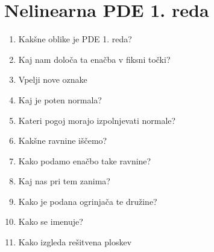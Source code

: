 \documentclass{article}
\begin{document}
    \section{Nelinearna PDE 1. reda}
    \begin{enumerate}
        \item Kakšne oblike je PDE 1. reda?
        \item Kaj nam določa ta enačba v fiksni točki?
        \item Vpelji nove oznake
        \item Kaj je poten normala?
        \item Kateri pogoj morajo izpolnjevati normale?
        \item Kakšne ravnine iščemo?
        \item Kako podamo enačbo take ravnine?
        \item Kaj nas pri tem zanima?
        \item Kako je podana ogrinjača te družine?
        \item Kako se imenuje?
        \item Kako izgleda rešitvena ploskev
    \end{enumerate}
\end{document}
